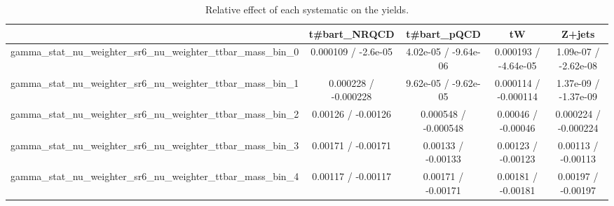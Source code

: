 \documentclass[10pt]{article}
\begin{document}
\begin{table}[htbp]
\begin{center}
\begin{tabular}{|c|c|c|c|c|}
\hline 
      & t#bar{t}_{NRQCD}      & t#bar{t}_{pQCD}      & tW      & Z+jets \\ 
\hline 
  gamma_stat_nu_weighter_sr6_nu_weighter_ttbar_mass_bin_0 & 0.000109 / -2.6e-05 & 4.02e-05 / -9.64e-06 & 0.000193 / -4.64e-05 & 1.09e-07 / -2.62e-08 \\ 
  gamma_stat_nu_weighter_sr6_nu_weighter_ttbar_mass_bin_1 & 0.000228 / -0.000228 & 9.62e-05 / -9.62e-05 & 0.000114 / -0.000114 & 1.37e-09 / -1.37e-09 \\ 
  gamma_stat_nu_weighter_sr6_nu_weighter_ttbar_mass_bin_2 & 0.00126 / -0.00126 & 0.000548 / -0.000548 & 0.00046 / -0.00046 & 0.000224 / -0.000224 \\ 
  gamma_stat_nu_weighter_sr6_nu_weighter_ttbar_mass_bin_3 & 0.00171 / -0.00171 & 0.00133 / -0.00133 & 0.00123 / -0.00123 & 0.00113 / -0.00113 \\ 
  gamma_stat_nu_weighter_sr6_nu_weighter_ttbar_mass_bin_4 & 0.00117 / -0.00117 & 0.00171 / -0.00171 & 0.00181 / -0.00181 & 0.00197 / -0.00197 \\ 
\hline 
\end{tabular} 
\caption{Relative effect of each systematic on the yields.} 
\end{center} 
\end{table} 
\end{document}
